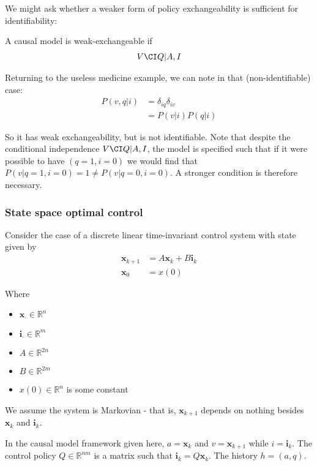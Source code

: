 We might ask whether a weaker form of policy exchangeability is sufficient for identifiability:

\begin{definition}
A causal model is weak-exchangeable if
\begin{align}
    V\CI Q | A,I
\end{align}
\end{definition}

Returning to the useless medicine example, we can note in that (non-identifiable) case:
\begin{align}
P(v,q|i) &= \delta_{iq} \delta_{iv}\\
         &= P(v|i) P(q|i)
\end{align}

So it has weak exchangeability, but is not identifiable. Note that despite the conditional independence $V\CI Q | A, I$, the model is specified such that if it were possible to have $(q=1,i=0)$ we would find that $P(v|q=1,i=0) = 1 \neq P(v|q=0,i=0)$. A stronger condition is therefore necessary.

\subsubsection{State space optimal control}

Consider the case of a discrete linear time-invariant control system with state given by
\begin{align}
    \mathbf{x}_{k+1} &= A\mathbf{x}_k + B\mathbf{i}_k\\
    \mathbf{x}_0 &= x(0)
\end{align}

Where 
\begin{itemize}
    \item $\mathbf{x}_\cdot \in \mathbb{R}^n$
    \item $\mathbf{i}_\cdot \in \mathbb{R}^m$
    \item $A\in \mathbb{R}^{2n}$
    \item $B\in \mathbb{R}^{2m}$
    \item $x(0)\in \mathbb{R}^n$ is some constant
\end{itemize}

We assume the system is Markovian - that is, $\mathbf{x}_{k+1}$ depends on nothing besides $\mathbf{x}_k$ and $\mathbf{i}_k$. 

In the causal model framework given here, $a=\mathbf{x}_k$ and $v=\mathbf{x}_{k+1}$ while $i=\mathbf{i}_k$. The control policy $Q\in \mathbb{R}^{nm}$ is a matrix such that $\mathbf{i}_k = Q\mathbf{x}_k$. The history $h=(a,q)$.

